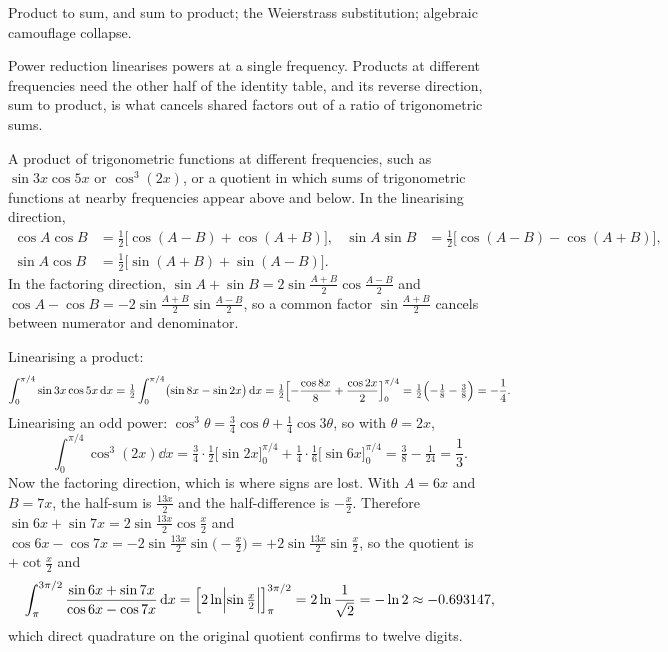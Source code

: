 \begin{seealsob}Product to sum, and sum to product; the Weierstrass substitution; algebraic camouflage collapse.\end{seealsob}

Power reduction linearises powers at a single frequency. Products at different frequencies need the other half of the identity table, and its reverse direction, sum to product, is what cancels shared factors out of a ratio of trigonometric sums.

\cue A product of trigonometric functions at different frequencies, such as $\sin3x\cos5x$ or $\cos^3(2x)$, or a quotient in which sums of trigonometric functions at nearby frequencies appear above and below.
\method In the linearising direction,
\begin{align*}
\cos A\cos B&=\tfrac12\bigl[\cos(A-B)+\cos(A+B)\bigr], &
\sin A\sin B&=\tfrac12\bigl[\cos(A-B)-\cos(A+B)\bigr],\\
\sin A\cos B&=\tfrac12\bigl[\sin(A+B)+\sin(A-B)\bigr]. &&
\end{align*}
In the factoring direction, $\sin A+\sin B=2\sin\tfrac{A+B}{2}\cos\tfrac{A-B}{2}$ and $\cos A-\cos B=-2\sin\tfrac{A+B}{2}\sin\tfrac{A-B}{2}$, so a common factor $\sin\tfrac{A+B}{2}$ cancels between numerator and denominator.

\begin{worked}
Linearising a product:
\[
\int_0^{\pi/4}\sin3x\cos5x\,\mathrm{d} x=\tfrac12\int_0^{\pi/4}\bigl(\sin8x-\sin2x\bigr)\,\mathrm{d} x
=\tfrac12\Bigl[-\frac{\cos8x}{8}+\frac{\cos2x}{2}\Bigr]_0^{\pi/4}=\tfrac12\Bigl(-\tfrac18-\tfrac38\Bigr)=-\frac14 .
\]
Linearising an odd power: $\cos^3\theta=\tfrac34\cos\theta+\tfrac14\cos3\theta$, so with $\theta=2x$,
\[
\int_0^{\pi/4}\cos^3(2x)\dd x=\tfrac34\cdot\tfrac12\bigl[\sin2x\bigr]_0^{\pi/4}+\tfrac14\cdot\tfrac16\bigl[\sin6x\bigr]_0^{\pi/4}=\tfrac38-\tfrac1{24}=\frac13 .
\]
Now the factoring direction, which is where signs are lost. With $A=6x$ and $B=7x$, the half-sum is $\tfrac{13x}{2}$ and the half-difference is $-\tfrac x2$. Therefore $\sin6x+\sin7x=2\sin\tfrac{13x}{2}\cos\tfrac x2$ and $\cos6x-\cos7x=-2\sin\tfrac{13x}{2}\sin\bigl(-\tfrac x2\bigr)=+2\sin\tfrac{13x}{2}\sin\tfrac x2$, so the quotient is $+\cot\tfrac x2$ and
\[
\int_{\pi}^{3\pi/2}\frac{\sin6x+\sin7x}{\cos6x-\cos7x}\,\mathrm{d} x=\Bigl[2\ln\Bigl|\sin\tfrac x2\Bigr|\Bigr]_{\pi}^{3\pi/2}=2\ln\frac{1}{\sqrt2}=-\ln2\approx-0.693147 ,
\]
which direct quadrature on the original quotient confirms to twelve digits.
\end{worked}

